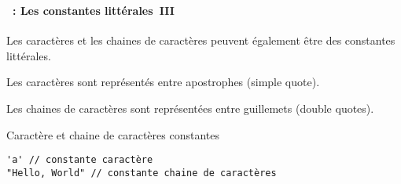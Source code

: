 \begin{frame}[containsverbatim]
  \frametitle{\secname}
  \framesubtitle{\subsecname~: Les constantes littérales~III}

  Les caractères et les chaines de caractères peuvent également être des constantes littérales.
  \vspace{0.5cm}
  \par
  Les caractères sont représentés entre apostrophes (simple quote).
  \vspace{0.5cm}
  \par
  Les chaines de caractères sont représentées entre guillemets (double quotes).
  \begin{exampleblock}{Caractère et chaine de caractères constantes}
    \begin{verbatim}
'a' // constante caractère
"Hello, World" // constante chaine de caractères 
    \end{verbatim}
  \end{exampleblock}
\end{frame}


